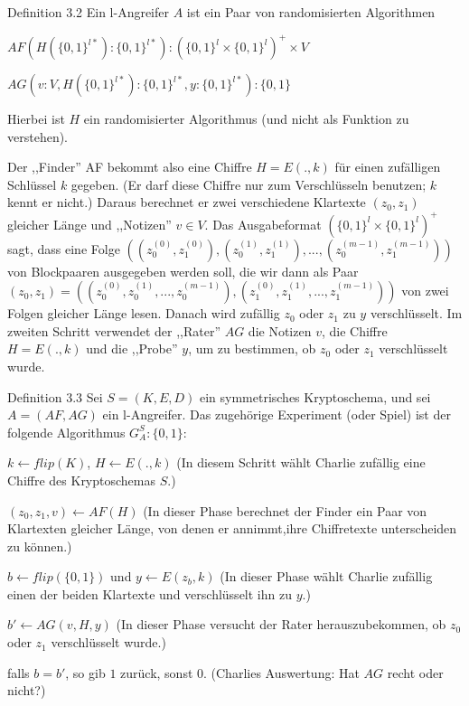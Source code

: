 \documentclass[a4paper]{article}
\begin{document}
\begin{multicols}{3}
    Definition 3.2 Ein l-Angreifer $A$ ist ein Paar von randomisierten Algorithmen
    \begin{itemize*}
        \item $AF(H(\{0,1\}^{l*}) :\{0,1\}^{l*}) : (\{0,1\}^l\times\{0,1\}^l)^+\times V$
        \item $AG(v:V,H(\{0,1\}^{l*}) :\{0,1\}^{l*},y:\{0,1\}^{l*}) :\{0,1\}$
    \end{itemize*}

    Hierbei ist $H$ ein randomisierter Algorithmus (und nicht als Funktion zu verstehen).

    Der ,,Finder'' AF bekommt also eine Chiffre $H=E(.,k)$ für einen zufälligen Schlüssel $k$ gegeben. (Er darf diese Chiffre nur zum Verschlüsseln benutzen; $k$ kennt er nicht.) Daraus berechnet er zwei verschiedene Klartexte $(z_0,z_1)$ gleicher Länge und ,,Notizen'' $v\in V$. Das Ausgabeformat $(\{0,1\}^l\times\{0,1\}^l)^+$ sagt, dass eine Folge $((z_0^{(0)},z^{(0)}_1),(z_0^{(1)},z_1^{(1)}),...,(z_0^{(m-1)},z_1^{(m-1)}))$ von Blockpaaren ausgegeben werden soll, die wir dann als Paar $(z_0 ,z_1) = ((z^{(0)}_0 ,z_0^{(1)},...,z_0^{(m-1)}),(z_1^{(0)},z^{(1)}_1 ,...,z_1^{(m-1)}))$ von zwei Folgen gleicher Länge lesen. Danach wird zufällig $z_0$ oder $z_1$ zu $y$ verschlüsselt.
    Im zweiten Schritt verwendet der ,,Rater'' $AG$ die Notizen $v$, die Chiffre $H=E(.,k)$ und die ,,Probe'' $y$, um zu bestimmen, ob $z_0$ oder $z_1$ verschlüsselt wurde.

    Definition 3.3 Sei $S=(K,E,D)$ ein symmetrisches Kryptoschema, und sei $A=(AF,AG)$ ein l-Angreifer. Das zugehörige Experiment (oder Spiel) ist der folgende Algorithmus $G^S_A:\{0,1\}:$
    \begin{enumerate*}
        \item $k\leftarrow flip(K)$, $H\leftarrow E(.,k)$ (In diesem Schritt wählt Charlie zufällig eine Chiffre des Kryptoschemas $S$.)
        \item  $(z_0, z_1 ,v)\leftarrow AF(H)$ (In dieser Phase berechnet der Finder ein Paar von Klartexten gleicher Länge, von denen er annimmt,ihre Chiffretexte unterscheiden zu können.)
        \item  $b\leftarrow flip(\{0,1\})$ und $y\leftarrow E(z_b,k)$ (In dieser Phase wählt Charlie zufällig einen der beiden Klartexte und verschlüsselt ihn zu $y$.)
        \item  $b'\leftarrow AG(v,H,y)$ (In dieser Phase versucht der Rater herauszubekommen, ob $z_0$ oder $z_1$ verschlüsselt wurde.)
        \item  falls $b=b'$, so gib $1$ zurück, sonst $0$. (Charlies Auswertung: Hat $AG$ recht oder nicht?)
    \end{enumerate*}


\end{multicols}
\end{document}
